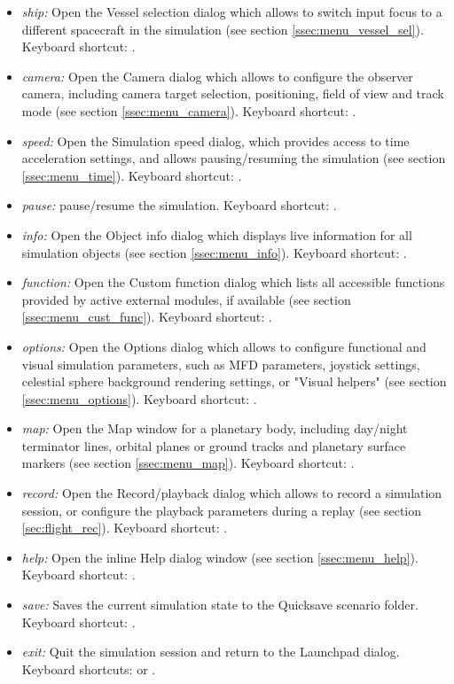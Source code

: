 \documentclass[Orbiter User Manual.tex]{subfiles}
\begin{document}
\begin{itemize}
	\item \emph{ship:} Open the Vessel selection dialog which allows to switch
		input focus to a different spacecraft in the simulation (see section
		\ref{ssec:menu_vessel_sel}). Keyboard shortcut: .
	\item \emph{camera:} Open the Camera dialog which allows to configure the
		observer camera, including camera target selection, positioning, field
		of view and track mode (see section \ref{ssec:menu_camera}). Keyboard
		shortcut: .
	\item \emph{speed:} Open the Simulation speed dialog, which provides access
		to time acceleration settings, and allows pausing/resuming the
		simulation (see section \ref{ssec:menu_time}). Keyboard shortcut:
		.
	\item \emph{pause:} pause/resume the simulation. Keyboard shortcut:
		.
	\item \emph{info:} Open the Object info dialog which displays live
		information for all simulation objects (see section
		\ref{ssec:menu_info}). Keyboard shortcut: .
	\item \emph{function:} Open the Custom function dialog which lists all
		accessible functions provided by active external modules, if available
		(see section \ref{ssec:menu_cust_func}). Keyboard shortcut:
		.
	\item \emph{options:} Open the Options dialog which allows to configure
		functional and visual simulation parameters, such as MFD parameters,
		joystick settings, celestial sphere background rendering settings, or
		"Visual helpers" (see section \ref{ssec:menu_options}). Keyboard
		shortcut: .
	\item \emph{map:} Open the Map window for a planetary body, including
		day/night terminator lines, orbital planes or ground tracks and
		planetary surface markers (see section \ref{ssec:menu_map}). Keyboard
		shortcut: .
	\item \emph{record:} Open the Record/playback dialog which allows to record
		a simulation session, or configure the playback parameters during a
		replay (see section \ref{sec:flight_rec}). Keyboard shortcut:
		.
	\item \emph{help:} Open the inline Help dialog window (see section
		\ref{ssec:menu_help}). Keyboard shortcut: .
	\item \emph{save:} Saves the current simulation state to the Quicksave
		scenario folder. Keyboard shortcut: .
	\item \emph{exit:} Quit the simulation session and return to the Launchpad
		dialog. Keyboard shortcuts:  or .
\end{itemize}
\end{document}
